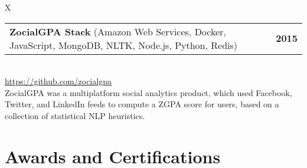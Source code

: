 \documentclass[10pt]{article}
\newcommand{\tabularxwidth}{\textwidth}
\begin{document}
        \begin{tabularx}{\tabularxwidth}{X}
                {
                    \begin{tabularx}{\tabularxwidth}{@{}X r}
                        \textbf{ZocialGPA Stack}
                            (Amazon Web Services, Docker, JavaScript, MongoDB, NLTK, Node.js, Python, Redis)
                        &
                        \textbf{
        2015} \\
                    \end{tabularx}
                } \\

            

            

            
                \url{https://github.com/zocialgpa} \\
            

            
    ZocialGPA was a multiplatform social analytics product, which used Facebook, Twitter, and LinkedIn feeds to compute a ZGPA score for users, based on a collection of statistical NLP heuristics. \\

        \end{tabularx}

        

    



    \pagebreak[3]

    
        \section{Awards and Certifications}
\end{document}
